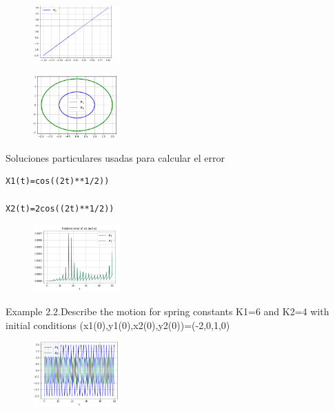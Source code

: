 \documentclass[a4paper]{article}
\begin{document}
\begin{figure}[ht!]
\centering
\includegraphics[width=0.3\textwidth]{2_1_2.png}
\end{figure}

\begin{figure}[ht!]
\centering
\includegraphics[width=0.3\textwidth]{2_1_3.png}
\end{figure}

\newpage


Soluciones particulares usadas para calcular el error 

\begin{verbatim}
X1(t)=cos((2t)**1/2))

X2(t)=2cos((2t)**1/2))
\end{verbatim}


\begin{figure}[ht!]
\centering
\includegraphics[width=0.3\textwidth]{2_1_4.png}
\end{figure}


Example 2.2.Describe the motion for spring constants K1=6 and K2=4 with initial conditions (x1(0),y1(0),x2(0),y2(0))=(-2,0,1,0)  

\begin{figure}[ht!]
\centering
\includegraphics[width=0.3\textwidth]{2_2_1.png}
\end{figure}
\end{document}
